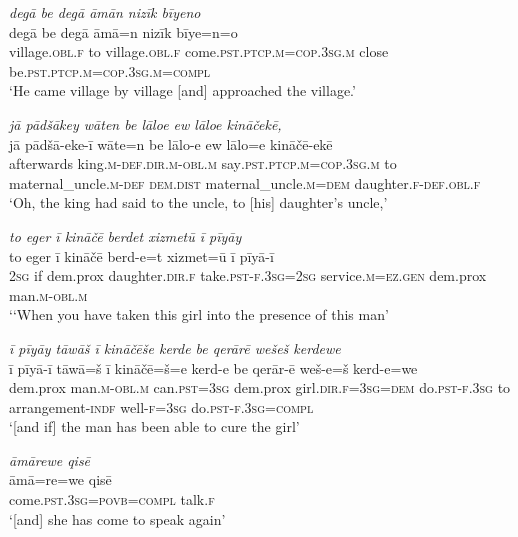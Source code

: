 \ea \label{ZP.42}
\textit{degā be degā āmān nizīk bīyeno} \\ 
\gll degā be degā āmā=n nizīk bīye=n=o \\ 
 village\textsc{.obl}\textsc{.f} to village\textsc{.obl}\textsc{.f} come\textsc{.pst}\textsc{.ptcp}\textsc{.m}\textsc{=cop}\textsc{.3sg}\textsc{.m} close be\textsc{.pst}\textsc{.ptcp}\textsc{.m}\textsc{=cop}\textsc{.3sg}\textsc{.m}\textsc{=compl} \\ 
\glt `He came village by village [and] approached the village.'
\z 
 
\ea \label{ZP.43}
\textit{jā pādšākey wāten be lāloe ew lāloe kināčekē,} \\ 
\gll jā pādšā-eke-ī wāte=n be lālo-e ew lālo=e kināčē-ekē \\ 
 afterwards king\textsc{.m}\textsc{-def}\textsc{.dir}\textsc{.m}\textsc{-obl}\textsc{.m} say\textsc{.pst}\textsc{.ptcp}\textsc{.m}\textsc{=cop}\textsc{.3sg}\textsc{.m} to maternal\_uncle\textsc{.m}\textsc{-def} \textsc{dem.dist} maternal\_uncle\textsc{.m}\textsc{=dem} daughter\textsc{.f}\textsc{-def}\textsc{.obl}\textsc{.f} \\ 
\glt `Oh, the king had said to the uncle, to [his] daughter’s uncle,'
\z 
 
\ea \label{ZP.44}
\textit{to eger ī kināčē berdet xizmetū ī pīyāy} \\ 
\gll to eger ī kināčē berd-e=t xizmet=ū ī pīyā-ī \\ 
 \textsc{2sg} if dem.prox daughter\textsc{.dir}\textsc{.f} take\textsc{.pst}\textsc{-f}\textsc{.3sg}\textsc{=\textsc{2sg}} service\textsc{.m}\textsc{\textsc{=ez.gen}} dem.prox man\textsc{.m}\textsc{-obl}\textsc{.m} \\ 
\glt `‘When you have taken this girl into the presence of this man'
\z 
 
\ea \label{ZP.45}
\textit{ī pīyāy tāwāš ī kināčēše kerde be qerārē wešeš kerdewe} \\ 
\gll ī pīyā-ī tāwā=š ī kināčē=š=e kerd-e be qerār-ē weš-e=š kerd-e=we \\ 
 dem.prox man\textsc{.m}\textsc{-obl}\textsc{.m} can\textsc{.pst}\textsc{=3sg} dem.prox girl\textsc{.dir}\textsc{.f}\textsc{=3sg}\textsc{=dem} do\textsc{.pst}\textsc{-f}\textsc{.3sg} to arrangement\textsc{-indf} well\textsc{-f}\textsc{=3sg} do\textsc{.pst}\textsc{-f}\textsc{.3sg}\textsc{=compl} \\ 
\glt `[and if] the man has been able to cure the girl'
\z 
 
\ea \label{ZP.46}
\textit{āmārewe qisē} \\ 
\gll āmā=re=we qisē \\ 
 come\textsc{.pst}\textsc{.3sg}\textsc{=\textsc{povb}}\textsc{=\textsc{compl}} talk\textsc{.f} \\ 
\glt `[and] she has come to speak again'
\z 
 
